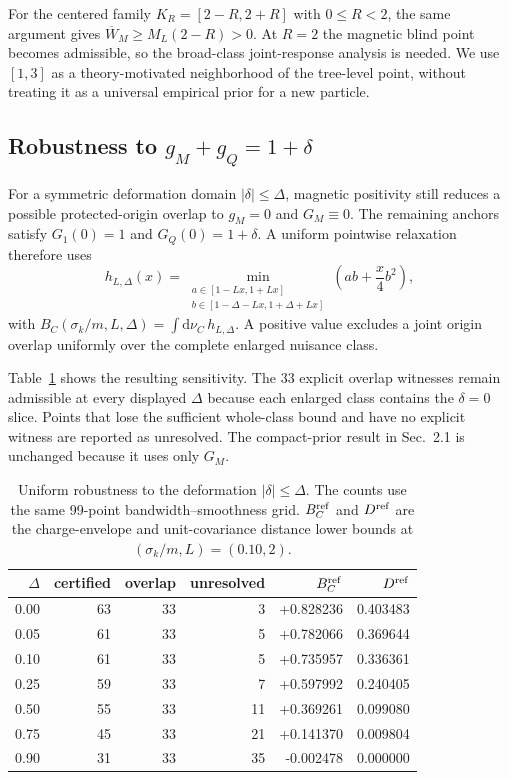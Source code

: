 \documentclass[12pt]{iopjournal}
\newcommand{\dd}{\mathrm d}
\newenvironment{ruledtabular}{\centering}{}
\newcommand{\colrule}{\hline}
\begin{document}
For the centered family $K_R=[2-R,2+R]$ with $0\le R<2$, the same argument gives $\overline W_M\ge M_L(2-R)>0$. At $R=2$ the magnetic blind point becomes admissible, so the broad-class joint-response analysis is needed. We use $[1,3]$ as a theory-motivated neighborhood of the tree-level point, without treating it as a universal empirical prior for a new particle.

\subsection{Robustness to $g_M+g_Q=1+\delta$}
For a symmetric deformation domain $|\delta|\le\Delta$, magnetic positivity still reduces a possible protected-origin overlap to $g_M=0$ and $G_M\equiv0$. The remaining anchors satisfy $G_1(0)=1$ and $G_Q(0)=1+\delta$. A uniform pointwise relaxation therefore uses
\begin{equation}
h_{L,\Delta}(x)=
\min_{\substack{a\in[1-Lx,1+Lx]\\
b\in[1-\Delta-Lx,1+\Delta+Lx]}}
\left(ab+\frac{x}{4}b^2\right),
\end{equation}
with $B_C(\sigma_k/m,L,\Delta)=\int\dd\nu_C\,h_{L,\Delta}$. A positive value excludes a joint origin overlap uniformly over the complete enlarged nuisance class.

Table~\ref{tab:delta-robustness} shows the resulting sensitivity. The $33$ explicit overlap witnesses remain admissible at every displayed $\Delta$ because each enlarged class contains the $\delta=0$ slice. Points that lose the sufficient whole-class bound and have no explicit witness are reported as unresolved. The compact-prior result in Sec.~2.1 is unchanged because it uses only $G_M$.

\begin{table}[h]
\caption{Uniform robustness to the deformation $|\delta|\le\Delta$. The counts use the same 99-point bandwidth--smoothness grid. $B_C^{\rm ref}$ and $D^{\rm ref}$ are the charge-envelope and unit-covariance distance lower bounds at $(\sigma_k/m,L)=(0.10,2)$.}
\label{tab:delta-robustness}
\begin{ruledtabular}
\begin{tabular}{rrrrrr}
$\Delta$ & certified & overlap & unresolved & $B_C^{\rm ref}$ & $D^{\rm ref}$\\
\colrule
0.00 & 63 & 33 & 3 & +0.828236 & 0.403483\\
0.05 & 61 & 33 & 5 & +0.782066 & 0.369644\\
0.10 & 61 & 33 & 5 & +0.735957 & 0.336361\\
0.25 & 59 & 33 & 7 & +0.597992 & 0.240405\\
0.50 & 55 & 33 & 11 & +0.369261 & 0.099080\\
0.75 & 45 & 33 & 21 & +0.141370 & 0.009804\\
0.90 & 31 & 33 & 35 & -0.002478 & 0.000000\\
\end{tabular}
\end{ruledtabular}
\end{table}
\end{document}
